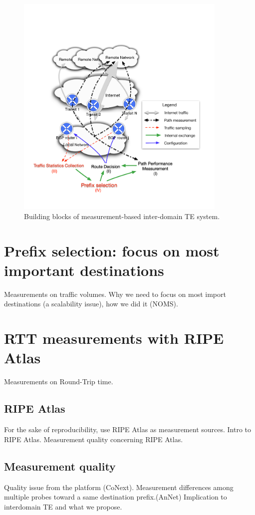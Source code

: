 \begin{figure}[!htb]
\centering
\includegraphics[width=0.9\textwidth]{gfx/chap1/archi.pdf}
\caption{Building blocks of measurement-based inter-domain TE system.}
\label{fig:archi}
\end{figure}

\section{Prefix selection: focus on most important destinations}
Measurements on traffic volumes.
Why we need to focus on most import destinations (a scalability issue), how we did it (NOMS).

\section{RTT measurements with RIPE Atlas}
Measurements on Round-Trip time.
\subsection{RIPE Atlas}
For the sake of reproducibility, use RIPE Atlas as measurement sources.
Intro to RIPE Atlas.
Measurement quality concerning RIPE Atlas.
\subsection{Measurement quality}
Quality issue from the platform (CoNext).
Measurement differences among multiple probes toward a same destination prefix.(AnNet)
Implication to interdomain TE and what we propose.
